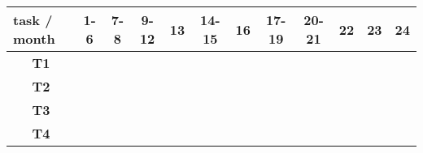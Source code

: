 \begin{table}[!h]
	\begin{tabular}{c|c|c|c|c|c|c|c|c|c|c|c}
	\multicolumn{1}{l|}{task / month} & \textbf{1-6}                       & \textbf{7-8}                       & \textbf{9-12}                      & \textbf{13}                        & \textbf{14-15}                     & \textbf{16}                        & \textbf{17-19}                     & \textbf{20-21}                     & \textbf{22}                        & \textbf{23}                        & \textbf{24}                        \\ \hline
	\textbf{T1}      & \textbf{\checkmark} & \textbf{\checkmark} & \textbf{\checkmark} & \textbf{\checkmark} & \textbf{\checkmark} & \textbf{\checkmark} & \textbf{\checkmark} & \textbf{\checkmark} & \textbf{\checkmark} & \textbf{\checkmark} & \textbf{\checkmark} \\ \hline
	\textbf{T2}      & \textbf{\checkmark} & \textbf{\checkmark} &                                                     & \textbf{\checkmark} &                                                     & \textbf{\checkmark} &                                                     &                                                     &                                                     &                                                     &                                                     \\ \hline
	\textbf{T3}      & \textbf{\checkmark} &                                                     &                                                     &                                                     &                                                     &                                                     &                                                     &                                                     &                                                     &                                                     &                                                     \\ \hline
	\textbf{T4}      &                                                     &                                                     & \textbf{\checkmark} &                                                     &                                                     &                                                     &                                                     &                                                     &                                                     &                                                     &                                                     \\ \hline

\end{tabular}
\end{table}

